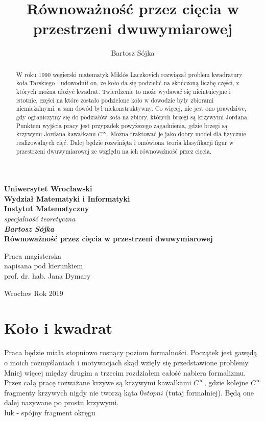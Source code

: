\documentclass[a4paper, 12pt]{article}
\title{Równoważność przez cięcia w przestrzeni dwuwymiarowej}
\author{Bartosz Sójka}
\begin{document}
\thispagestyle{empty}
\begin{center}
\textbf{\large Uniwersytet Wrocławski\\
Wydział Matematyki i Informatyki\\
Instytut Matematyczny}\\
\textit{\large specjalność teoretyczna}\\
\vspace{4cm}
\textbf{\textit{\large Bartosz Sójka}\\
\vspace{0.5cm}
{\Large Równoważność przez cięcia w przestrzeni dwuwymiarowej}}\\
\end{center}
\vspace{3cm}
{\large \hspace*{6.5cm}Praca magisterska\\
\hspace*{6.5cm}napisana pod kierunkiem\\
\hspace*{6.5cm}prof. dr. hab. Jana Dymary }\\
\vfill
\begin{center}
{\large Wrocław Rok 2019}\\
\end{center}
\newpage
\null
\thispagestyle{empty}
\newpage
\tableofcontents

\begin{abstract}
    W roku 1990 wegierski matematyk Miklós Laczkovich rozwiązał problem kwadratury koła Tarskiego - udowodnił
     on, że koło da się podzielić na skończoną liczbę części, z których można ułożyć kwadrat. Twierdzenie
     to może wydawać się nieintuicyjne i istotnie, części na które zostało podzielone koło w dowodzie były
     zbiorami niemieżalnymi, a sam dowód był niekonstruktywny. Co więcej, nie jest ono prawdziwe, gdy
     ograniczymy się do podziałów koła na zbiory, których brzegi są krzywymi Jordana. Punktem wyjścia
     pracy jest przypadek powyższego zagadnienia, gdzie brzegi są krzywymi Jordana kawałkami $C^\infty$.
     Można traktować je jako dobry model dla fizycznie realizowalnych cięć. Dalej będzie rozwinięta i
     omówiona teoria klasyfikacji figur w przestrzeni dwuwymiarowej ze względu na ich równoważność przez
     cięcia.
 \end{abstract}

 \section{Koło i kwadrat}
Praca będzie miała stopniowo rosnący poziom formalności. Początek jest gawędą o moich rozmyślaniach i
motywacjach skąd wzięły się przedstawione problemy. Mniej więcej między  drugim a trzecim rozdziałem
całość nabiera formalizmu. Przez całą pracę rozważane krzywe są krzywymi kawałkami $C^\infty$, gdzie kolejne
$C^\infty$ fragmenty krzywych nigdy nie tworzą kąta $0stopni$ (tutaj formalniej). Będą one dalej nazywane
po prostu krzywymi. \\
łuk - spójny fragment okręgu \\[16pt]
\end{document}
